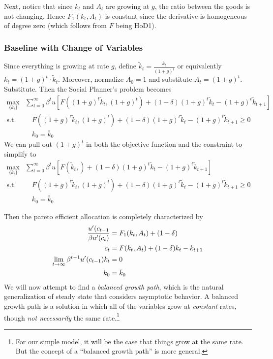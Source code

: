 \documentclass[12pt]{article}
\theoremstyle{plain}
\theoremstyle{definition}
\theoremstyle{remark}
\newcommand{\limt}{\lim_{t\rightarrow\infty}}
\newcommand{\sumtinfz}{\sum^\infty_{t=0}}
\begin{document}
Next, notice that since $k_t$ and $A_t$ are growing at $g$, the ratio
between the goods is not changing. Hence $F_1(k_t,A_t)$ is constant
since the derivative is homogeneous of degree zero (which follows from
$F$ being HoD1).

\subsubsection{Baseline with Change of Variables}

Since everything is growing at rate $g$, define
$\tilde{k}_t = \frac{k_t}{(1+g)^t}$ or equivalently
$k_t=(1+g)^t\cdot \tilde{k}_t$. Moreover, normalize $A_0=1$ and
substitute $A_t=(1+g)^t$. Substitute. Then the Social Planner's problem
becomes
\begin{align*}
  \max_{\{k_t\}}
    &\sumtinfz \beta^t u\left[F\left((1+g)^t\tilde{k}_t,(1+g)^{t}\right)
      + (1-\delta) (1+g)^t\tilde{k}_t - (1+g)^t\tilde{k}_{t+1}\right] \\
    \text{s.t.} &\quad
    F((1+g)^t\tilde{k}_t,(1+g)^t) + (1-\delta) (1+g)^t\tilde{k}_t
      - (1+g)^t\tilde{k}_{t+1}\geq 0\\
    &\quad k_0 = \bar{k}_0
\end{align*}
We can pull out $(1+g)^t$ in both the objective function and the
constraint to simplify to
\begin{align*}
  \max_{\{k_t\}}
    &\sumtinfz \beta^t u\left[F\left(\tilde{k}_t,\right)
      + (1-\delta) (1+g)^t\tilde{k}_t - (1+g)^t\tilde{k}_{t+1}\right] \\
    \text{s.t.} &\quad
    F((1+g)^t\tilde{k}_t,(1+g)^t) + (1-\delta) (1+g)^t\tilde{k}_t
      - (1+g)^t\tilde{k}_{t+1}\geq 0\\
    &\quad k_0 = \bar{k}_0
\end{align*}

Then the pareto efficient allocation is completely characterized by
\begin{align}
  \frac{u'(c_{t-1}}{\beta u'(c_{t})}
  &= F_1(k_t,A_t) + (1-\delta) \\
  c_t &= F(k_t,A_t) + (1-\delta)k_t - k_{t+1}\notag\\
  \limt \beta^{t-1}u'(c_{t-1}) k_t &= 0 \notag\\
  k_0 &= \bar{k}_0\notag
\end{align}
We will now attempt to find a \emph{balanced growth path}, which is the
natural generalization of steady state that considers asymptotic
behavior. A balanced growth path is a solution in which all of the
variables grow at \emph{constant} rates, though \emph{not necessarily}
the same rate.\footnote{%
  For our simple model, it will be the case that things grow at the same
  rate. But the concept of a ``balanced growth path'' is more general.
}
\end{document}
